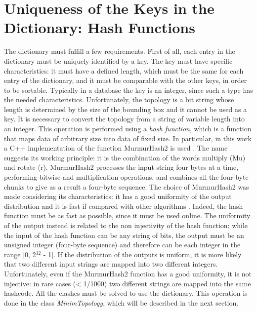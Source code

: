 \section{Uniqueness of the Keys in the Dictionary: Hash Functions}
The dictionary must fulfill a few requirements. First of all, each entry in the dictionary must be uniquely identified by a key. The key must have specific characteristics: it must have a defined length, which must be the same for each entry of the dictionary, and it must be comparable with the other keys, in order to be sortable. Typically in a database the key is an integer, since such a type has the needed characteristics. Unfortunately, the topology is a bit string whose length is determined by the size of the bounding box and it cannot be used as a key. It is necessary to convert the topology from a string of variable length into an integer. This operation is performed using a \textit{hash function}, which is a function that maps data of arbitrary size into data of fixed size. In particular, in this work a C++ implementation of the function MurmurHash2 is used . The name suggests its working principle: it is the combination of the words multiply (Mu) and rotate (r). MurmurHash2 processes the input string four bytes at a time, performing bitwise and multiplication operations, and combines all the four-byte chunks to give as a result a four-byte sequence. The choice of MurmurHash2 was made considering its characteristics: it has a good uniformity of the output distribution and it is fast if compared with other algorithms \cite{hash}. Indeed, the hash function must be as fast as possible, since it must be used online. The uniformity of the output instead is related to the non injectivity of the hash function: while the input of the hash function can be any string of bits, the output must be an unsigned integer (four-byte sequence) and therefore can be each integer in the range [0, 2$^{32}$ - 1]. If the distribution of the outputs is uniform, it is more likely that two different input strings are mapped into two different integers. Unfortunately, even if the MurmurHash2 function has a good uniformity, it is not injective: in rare cases (< 1/1000) two different strings are mapped into the same hashcode. All the clashes must be solved to use the dictionary. This operation is done in the class \textit{MinimTopology}, which will be described in the next section.
%
